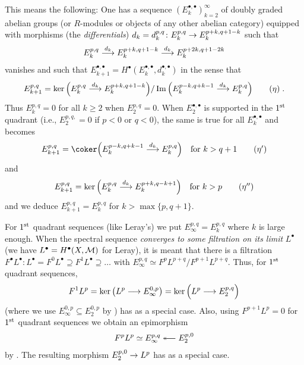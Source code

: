 \documentclass[a4paper,parskip=half,numbers=enddot, DIV=12]{scrreprt}
\begin{document}
This means the following: One has a sequence $\left(E_k^{\bullet,\bullet}\right)_{k=2}^\infty$ of doubly graded abelian groups (or $R$-modules or objects of any other abelian category) equipped with morphisms (the \emph{differentials}) $d_k=d_k^{p,q}\colon E_k^{p,q}\morphism E_k^{p+k,q+1-k}$ such that 
\begin{align*}
	E_k^{p,q}\morphism[d_k]E_k^{p+k,q+1-k}\morphism[d_k]E_k^{p+2k,q+1-2k}
\end{align*}
vanishes and such that $E_{k+1}^{\bullet,\bullet}=H^\bullet (E_k^{\bullet,\bullet},d_k^{\bullet,\bullet})$ in the sense that
\begin{align}\lbl{eq:eta}
	E_{k+1}^{p,q}=\ker\Big(E_k^{p,q}\morphism[d_k]E_k^{p+k,q+1-k}\Big)/\Im\Big(E_k^{p-k,q+k-1}\morphism[d_k]E_k^{p,q}\Big)\tag{$\eta$}\;.
\end{align}
Thus $E_k^{p,q}=0$ for all $k\geq 2$ when $E_2^{p,q}=0$. When $E_2^{\bullet,\bullet}$ is supported in the $1^{\text{st}}$ quadrant (i.e., $E_2^{p,q,}=0$ if $p<0$ or $q<0$), the same is true for all $E_k^{\bullet,\bullet}$ and  becomes
\begin{align}\lbl{eq:eta'}
	E_{k+1}^{p,q}=\coker\Big(E_k^{p-k,q+k-1}\morphism[d_k]E_k^{p,q}\Big)\quad\text{for }k>q+1\tag{$\eta'$}
\end{align}
and 
\begin{align}\lbl{eq:eta''}
	E_{k+1}^{p,q}=\ker\Big(E_k^{p,q}\morphism[d_k]E_k^{p+k,q-k+1}\Big)\quad\text{for }k>p\tag{$\eta''$}
\end{align}
and we deduce $E_{k+1}^{p,q}=E_k^{p,q}$ for $k>\max\{p,q+1\}$.

For $1^{\text{st}}$ quadrant sequences (like Leray's) we put $E_\infty^{p,q}=E_k^{p,q}$ where $k$ is large enough. When the spectral sequence \emph{converges to some filtration on its limit} $L^\bullet $ (we have $L^\bullet =H^\bullet (X,\mathcal{M})$ for Leray), it is meant that there is a filtration $F^\bullet L^\bullet \colon L^\bullet =F^0L^\bullet \supseteq F^1L^\bullet\supseteq \ldots$ with $E_\infty^{p,q}\simeq F^pL^{p+q}/F^{p+1}L^{p+q}$. Thus, for $1^{\text{st}}$ quadrant sequences,
\begin{align*}
	F^1L^p=\ker\left(L^p\morphism E_\infty^{0,p}\right)=\ker\Big(L^p\morphism E_2^{p,q}\Big)
\end{align*}
(where we use $E_\infty^{0,p}\subseteq E_2^{0,p}$ by ) has  as a special case. Also, using $F^{p+1}L^p=0$ for $1^{\text{st}}$ quadrant sequences we obtain an epimorphism
\begin{align*}
	F^pL^p\simeq E_\infty^{p,q}\lepimorphism E_2^{p,0}
\end{align*}
by . The resulting morphism $E_2^{p,0}\morphism L^p$ has  as a special case.
\end{document}
